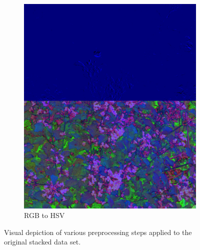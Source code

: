 \documentclass[sigchi,screen]{acmart}
\begin{document}
\begin{figure}[htp]
\begin{subfigure}{0.25\linewidth}
    \includegraphics[width=\linewidth]{figures/preprocessings/hsv.jpg}
    \caption{RGB to HSV}
  \end{subfigure}
  \caption{Visual depiction of various preprocessing steps applied to the original stacked data set.}
  \label{fig:preprocessings}
\end{figure}
\end{document}
